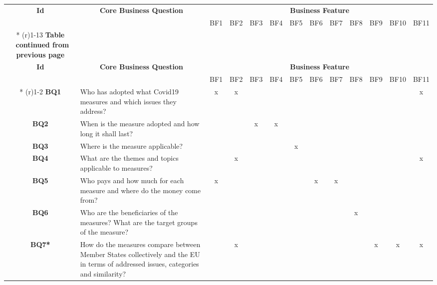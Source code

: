 \begin{landscape}
\begin{longtable}[c]{@{}cp{5cm}llllllllllc@{}}
	\toprule
	\multirow{2}{*}{\textbf{Id}} & \multicolumn{1}{c}{\multirow{2}{*}{\textbf{Core Business Question}}} & \multicolumn{11}{c}{\textbf{Business Feature}} \\* \cmidrule(l){3-13} 
	& \multicolumn{1}{c}{} & BF1 & BF2 & BF3 & BF4 & BF5 & BF6 & BF7 & BF8 & BF9 & BF10 & BF11 \\* \cmidrule(r){1-13}
	\endfirsthead
	\multicolumn{13}{c}%
	{{\bfseries Table \thetable\ continued from previous page}} \\
	\toprule
	\multirow{2}{*}{\textbf{Id}} & \multicolumn{1}{c}{\multirow{2}{*}{\textbf{Core Business Question}}} & \multicolumn{11}{c}{\textbf{Business Feature}} \\* \cmidrule(l){3-13} 
	& \multicolumn{1}{c}{} & BF1 & BF2 & BF3 & BF4 & BF5 & BF6 & BF7 & BF8 & BF9 & BF10 & BF11 \\* \cmidrule(r){1-2}
	\endhead
	\bottomrule
	\endfoot
	\endlastfoot
	\textbf{BQ1} & Who has adopted what Covid19 measures and which issues they address? & \multicolumn{1}{c}{x} & \multicolumn{1}{c}{x} &  &  &  &  &  &  &  &  & x \\
	\textbf{BQ2} & When is the measure adopted and how long it shall last? &  &  & \multicolumn{1}{c}{x} & \multicolumn{1}{c}{x} &  &  &  &  &  &  & \multicolumn{1}{l}{} \\
	\textbf{BQ3} & Where is the measure applicable? &  &  &  &  & \multicolumn{1}{c}{x} &  &  &  &  &  & \multicolumn{1}{l}{} \\
	\textbf{BQ4} & What are the themes and topics applicable to measures? &  & \multicolumn{1}{c}{x} &  &  &  &  &  &  &  &  & x \\
	\textbf{BQ5} & Who pays and how much for each measure and where do the money come from? & \multicolumn{1}{c}{x} &  &  &  &  & \multicolumn{1}{c}{x} & \multicolumn{1}{c}{x} &  &  &  & \multicolumn{1}{l}{} \\
	\textbf{BQ6} & Who are the beneficiaries of the measures? What are the target groups of the measure? &  &  &  &  &  &  &  & \multicolumn{1}{c}{x} &  &  & \multicolumn{1}{l}{} \\
	\textbf{BQ7*} & How do the measures compare between Member States collectively and the EU in terms of addressed issues, categories and similarity? &  & \multicolumn{1}{c}{x} &  &  &  &  &  &  & \multicolumn{1}{c}{x} & \multicolumn{1}{c}{x} & x \\

\end{longtable}
\end{landscape}
